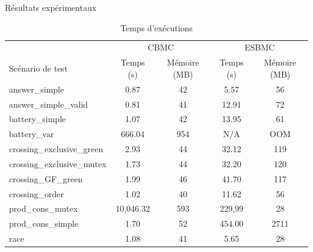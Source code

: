 \documentclass{beamer}
\begin{document}
\begin{frame}{Résultats expérimentaux}
\begin{table}[tbp]
\centering
\scriptsize
\label{tbl:performances}
\caption{Temps d'exécutions}
\begin{tabular}{|l|c|c|c|c|}
\hline
                           & \multicolumn{2}{c|}{CBMC} & \multicolumn{2}{c|}{ESBMC}\\
Scénario de test           & Temps (s) & Mémoire (MB) & Temps (s) & Mémoire (MB) \\
\hline
answer\_simple             & 0.87      & 42           & 5.57      & 56           \\
answer\_simple\_valid      & 0.81      & 41           & 12.91     & 72           \\
battery\_simple            & 1.07      & 42           & 13.95     & 61           \\
battery\_var               & 666.04    & 954          & N/A       & OOM          \\
crossing\_exclusive\_green & 2.93      & 44           & 32.12     & 119          \\
crossing\_exclusive\_mutex & 1.73      & 44           & 32.20     & 120          \\
crossing\_GF\_green        & 1.99      & 46           & 41.70     & 117          \\
crossing\_order            & 1.02      & 40           & 11.62     & 56           \\
prod\_cons\_mutex          & 10,046.32 & 593          & 229,99    & 28           \\
prod\_cons\_simple         & 1.70      & 52           & 454.00    & 2711         \\
race                       & 1.08      & 41           & 5.65      & 28           \\
\hline
\end{tabular}
\end{table}
\end{frame}
\end{document}
